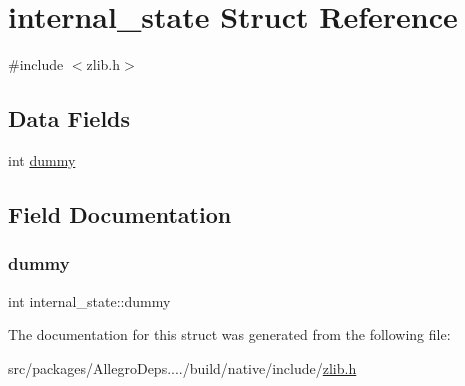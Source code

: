 \hypertarget{structinternal__state}{}\section{internal\+\_\+state Struct Reference}
\label{structinternal__state}


{\ttfamily \#include $<$zlib.\+h$>$}

\subsection*{Data Fields}
\begin{DoxyCompactItemize}
\item 
int \hyperlink{structinternal__state_ab000a3e3c901dd063859521988ad7e52}{dummy}
\end{DoxyCompactItemize}


\subsection{Field Documentation}
\mbox{\label{structinternal__state_ab000a3e3c901dd063859521988ad7e52}} 
\subsubsection{\texorpdfstring{dummy}{dummy}}
{\footnotesize\ttfamily int internal\+\_\+state\+::dummy}



The documentation for this struct was generated from the following file\+:\begin{DoxyCompactItemize}
\item 
src/packages/\+Allegro\+Deps..../build/native/include/\hyperlink{zlib_8h}{zlib.\+h}\end{DoxyCompactItemize}
